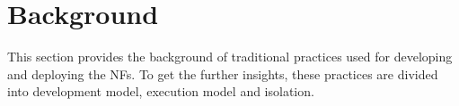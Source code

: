 \documentclass[10pt, a4paper, conference]{IEEEtran}
\begin{document}
\section{Background}
%	

This section provides the background of traditional practices used for developing and deploying the NFs. To get the further insights, these practices are divided into development model, execution model and isolation.
\end{document}
